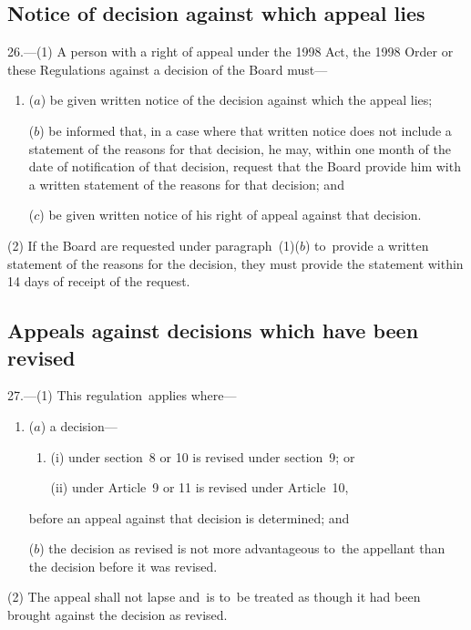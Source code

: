 \documentclass[12pt,a4paper]{article}
\begin{document}
\subsection[26. Notice of decision against which appeal lies]{Notice of decision against which appeal lies}

26.---(1)  A person with a right of appeal under the 1998 Act, the 1998 Order or these Regulations against a decision of the Board must—
\begin{enumerate}\item[]
($a$) be given written notice of the decision against which the appeal lies;

($b$) be informed that, in a case where that written notice does not include a statement of the reasons for that decision, he may, within one month of the date of notification of that decision, request that the Board provide him with a written statement of the reasons for that decision; and

($c$) be given written notice of his right of appeal against that decision.
\end{enumerate}

(2) If the Board are requested under paragraph~(1)($b$)  to~provide a written statement of the reasons for the decision, they must provide the statement within 14 days of receipt of the request.

\subsection[27. Appeals against decisions which have been revised]{Appeals against decisions which have been revised}

27.---(1)  This regulation~applies where—
\begin{enumerate}\item[]
($a$) a decision—
\begin{enumerate}\item[]
(i) under section~8 or 10 is revised under section~9; or

(ii) under Article~9 or 11 is revised under Article~10,
\end{enumerate}
before an appeal against that decision is determined; and

($b$) the decision as revised is not more advantageous to~the appellant than the decision before it was revised.
\end{enumerate}

(2) The appeal shall not lapse and~is to~be treated as though it had been brought against the decision as revised.
\end{document}
